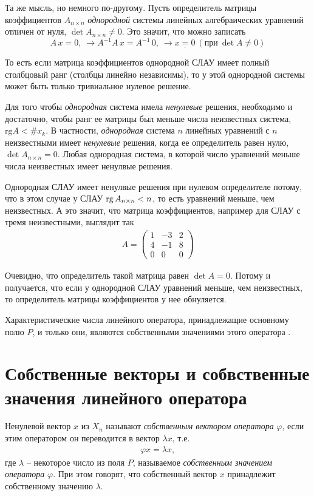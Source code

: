 \documentclass[%
	11pt,
	a4paper,
	utf8,
		]{article}
\begin{document}
Та же мысль, но немного по-другому. Пусть определитель матрицы коэффициентов $ A_{n \times n} $ \emph{однородной} системы линейных алгебраических уравнений отличен от нуля, $ \det A_{n \times n} \neq 0 $. Это значит, что можно записать
$$
A \, x = 0,\ \rightarrow A^{-1} A \, x = A^{-1} \, 0,\ \rightarrow \underline{x = 0} \ (\text{при} \ \det A \neq 0)
$$

То есть если матрица коэффициентов однородной СЛАУ имеет полный столбцовый ранг (столбцы линейно независимы), то у этой однородной системы может быть только тривиальное нулевое решение.

Для того чтобы \emph{однородная} система имела \emph{ненулевые} решения, необходимо и достаточно, чтобы ранг ее матрицы был меньше числа неизвестных система, $ \text{rg} A < \#x_k $. В частности, \emph{однородная} система $ n $ линейных уравнений с $ n $ неизвестными имеет \emph{ненулевые} решения, когда ее определитель равен нулю, $ \det A_{n \times n} = 0 $. Любая однородная система, в которой число уравнений меньше числа неизвестных имеет ненулвые решения.

Однородная СЛАУ имеет ненулвые решения при нулевом определителе потому, что в этом случае у СЛАУ $ \operatorname*{rg} A_{n \times n} < n $, то есть уравнений меньше, чем неизвестных. А это значит, что матрица коэффициентов, например для СЛАУ с тремя неизвестными, выглядит так
\begin{align*}
	A = \begin{pmatrix}
		1 & -3 & 2\\
		4 & -1 & 8 \\
		0 & 0 & 0
	\end{pmatrix}
\end{align*}

Очевидно, что определитель такой матрица равен $ \det A = 0 $. Потому и получается, что если у однородной СЛАУ уравнений меньше, чем неизвестных, то определитель матрицы коэффициентов у нее обнуляется.

Характеристические числа линейного оператора, принадлежащие основному полю $ P $, и только они, являются собственными значениями этого оператора \cite[]{shevtsov:linal-2012}.

\section{Собственные векторы и собвственные значения линейного оператора}

Ненулевой вектор $ x $ из $ X_n $ называют \emph{собственным вектором оператора} $ \varphi $, если этим оператором он переводится в вектор $ \lambda x $, т.е.
\begin{align*}
	\varphi x = \lambda x,
\end{align*}
где $ \lambda $ -- некоторое число из поля $ P $, называемое \emph{собственным значением оператора} $ \varphi $. При этом говорят, что собственный вектор $ x $ принадлежит собственному значению $ \lambda $.
\end{document}
